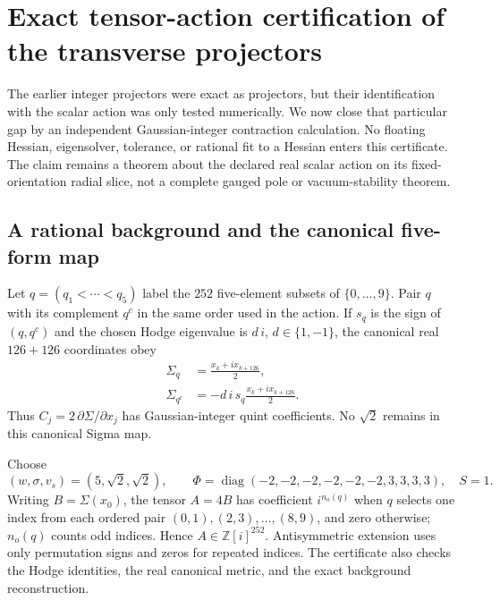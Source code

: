 \section{Exact tensor-action certification of the transverse projectors}
\label{sec:exact-transverse-action-certificate}

The earlier integer projectors were exact as projectors, but their
identification with the scalar action was only tested numerically.  We now
close that particular gap by an independent Gaussian-integer contraction
calculation.  No floating Hessian, eigensolver, tolerance, or rational fit to
a Hessian enters this certificate.  The claim remains a theorem about the
declared real scalar action on its fixed-orientation radial slice, not a
complete gauged pole or vacuum-stability theorem.

\subsection{A rational background and the canonical five-form map}

Let $q=(q_1<\cdots<q_5)$ label the $252$ five-element subsets of
$\{0,\ldots,9\}$.  Pair $q$ with its complement $q^c$ in the same order
used in the action.  If $s_q$ is the sign of $(q,q^c)$ and the chosen
Hodge eigenvalue is $d\,i$, $d\in\{1,-1\}$, the canonical real
$126+126$ coordinates obey
\begin{align}
 \Sigma_q&=\frac{x_k+i x_{k+126}}2,\\
 \Sigma_{q^c}&=-d\,i\,s_q\frac{x_k+i x_{k+126}}2.
\end{align}
Thus $C_j=2\,\partial\Sigma/\partial x_j$ has Gaussian-integer
quint coefficients.  No $\sqrt2$ remains in this canonical Sigma map.

Choose
\begin{equation}
 (w,\sigma,v_s)=(5,\sqrt2,\sqrt2),\qquad
 \Phi=\operatorname{diag}(-2,-2,-2,-2,-2,-2,3,3,3,3),\quad S=1.
\end{equation}
Writing $B=\Sigma(x_0)$, the tensor $A=4B$ has coefficient
$i^{n_o(q)}$ when $q$ selects one index from each ordered pair
$(0,1),(2,3),\ldots,(8,9)$, and zero otherwise; $n_o(q)$ counts odd
indices.  Hence $A\in\mathbb Z[i]^{252}$.  Antisymmetric extension
uses only permutation signs and zeros for repeated indices.
The certificate also checks the Hodge identities, the real canonical
metric, and the exact background reconstruction.

